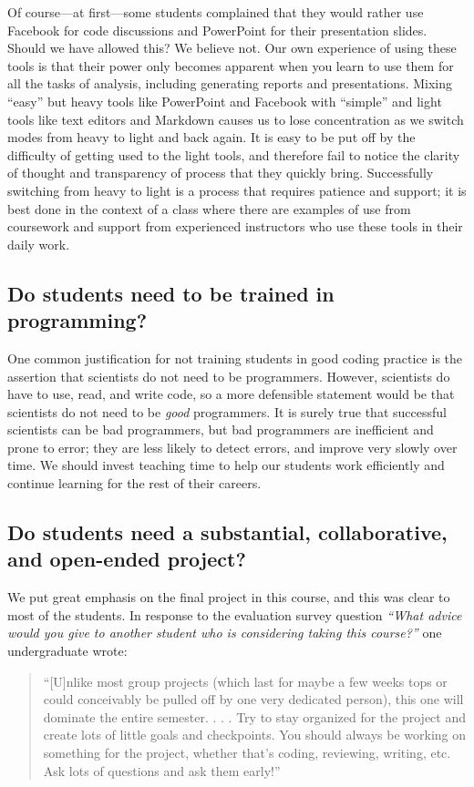 Of course---at first---some students complained that they would rather use
Facebook for code discussions and PowerPoint for their presentation slides.
Should we have allowed this?  We believe not.  Our own experience
of using these tools is that their power only becomes apparent
when you learn to use them for all the tasks of analysis, including generating
reports and presentations.  Mixing ``easy'' but heavy tools like PowerPoint
and Facebook with ``simple'' and light tools like text editors and Markdown
causes us to lose concentration as we switch modes from heavy to light and
back again. It is easy to be put off by the difficulty of getting used to the
light tools, and therefore fail to notice the clarity of thought and
transparency of process that they quickly bring.  Successfully switching from
heavy to light is a process that requires patience and support; it is best
done in the context of a class where there are examples of use from coursework
and support from experienced instructors who use these tools in their daily
work.

\subsection{Do students need to be trained in programming?}

One common justification for not training students in good coding practice is
the assertion that scientists do not need to be programmers.  However, scientists do
have to use, read, and write code, so a more defensible
statement would be that scientists do not need to be \emph{good} programmers.
It is surely true that successful scientists can be bad programmers, but bad
programmers are inefficient and prone to error; they are less likely to detect
errors, and improve very slowly over time.  We should invest teaching time
to help our students work efficiently and continue learning for the rest of
their careers.

\subsection{Do students need a substantial, collaborative, and open-ended project?}

We put great emphasis on the final project in this course, and this was clear
to most of the students.  In response to the evaluation survey question
\emph{``What advice would you give to another student who is considering taking this course?''}
one undergraduate wrote:
\begin{quotation}
``[U]nlike most group projects (which last for maybe a few weeks tops or
could conceivably be pulled off by one very dedicated person), this one will
dominate the entire semester. . . . Try to stay organized for the project and
create lots of little goals and checkpoints. You should always be working on
something for the project, whether that's coding, reviewing, writing, etc. Ask
lots of questions and ask them early!''
\end{quotation}


